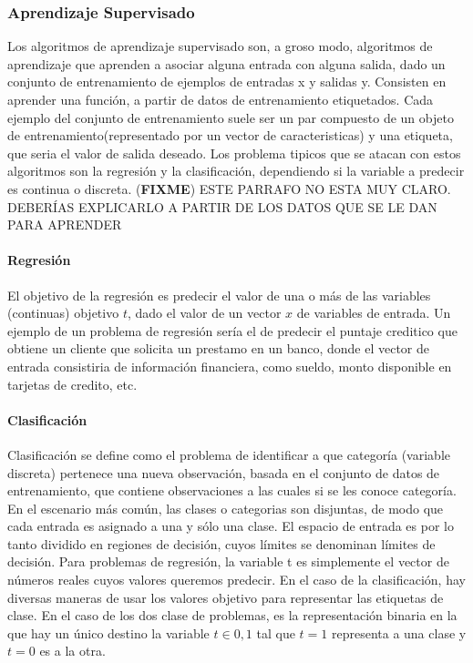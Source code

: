 \documentclass[a4paper,11pt,spanish]{book}
\newcommand*{\FIXME}[1]{{(\textbf{FIXME}) {#1}}}
\begin{document}
      \subsubsection{Aprendizaje Supervisado}
	Los algoritmos de aprendizaje supervisado son, a groso modo, algoritmos de aprendizaje que aprenden a asociar alguna entrada con alguna salida,
	dado un conjunto de entrenamiento de ejemplos de entradas x y salidas y.
	Consisten en aprender una función, a partir de datos de entrenamiento etiquetados. Cada ejemplo del conjunto de entrenamiento suele ser un par
	compuesto de un objeto de entrenamiento(representado por un vector de caracteristicas) y una etiqueta, que seria el valor de salida deseado.
	Los problema tipicos que se atacan con estos algoritmos son la regresión
        y la clasificación, dependiendo si la variable a predecir es continua o
        discreta. \FIXME{ESTE PARRAFO NO ESTA MUY CLARO. DEBERÍAS EXPLICARLO A
          PARTIR DE LOS DATOS QUE SE LE DAN PARA APRENDER} \\

	\paragraph {Regresión}
	  El objetivo de la regresión es predecir el valor de una o más de las variables (continuas) objetivo $t$, dado el valor de un vector $x$ de variables de entrada.
	  Un ejemplo de un problema de regresión sería el de predecir el puntaje creditico que obtiene un cliente que solicita un prestamo en un banco, donde el vector de entrada
	  consistiria de información financiera, como sueldo, monto disponible en tarjetas de credito, etc.
	\paragraph {Clasificación}
	  Clasificación se define como el problema de identificar a que categoría (variable discreta) pertenece una nueva observación, basada en el conjunto de datos de entrenamiento,
	  que contiene observaciones a las cuales  si se les conoce categoría. En el escenario más común, las clases o categorias son disjuntas,
	  de modo que cada entrada es asignado a una y sólo una clase. El espacio de entrada es por lo tanto dividido en regiones de decisión, cuyos límites se denominan límites de decisión.
	  Para problemas de regresión, la variable t es simplemente el vector de números reales cuyos valores queremos predecir. En el caso de la clasificación,
	  hay diversas maneras de usar los valores objetivo para representar las etiquetas de clase. En el caso de los dos clase de problemas, es la representación binaria
	  en la que hay un único destino la variable $t \in {0, 1}$ tal que $t = 1$ representa a una clase y $t = 0$ es a la otra.
\end{document}
